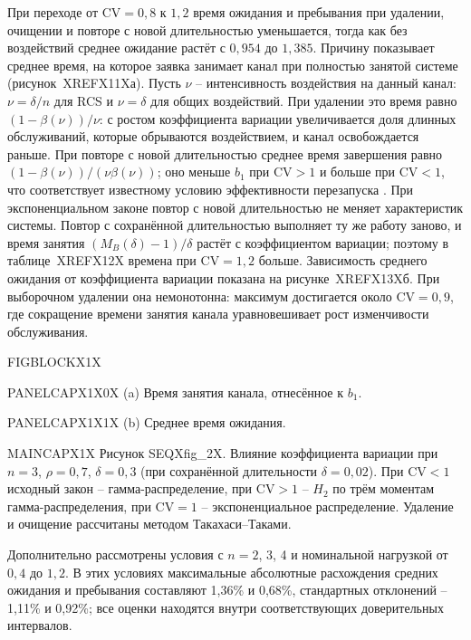 При переходе от \(\mathrm{CV}=0{,}8\) к \(1{,}2\) время ожидания и пребывания при удалении, очищении и повторе с новой длительностью уменьшается, тогда как без воздействий среднее ожидание растёт с \(0{,}954\) до \(1{,}385\). Причину показывает среднее время, на которое заявка занимает канал при полностью занятой системе (рисунок~XREFX11Xа). Пусть \(\nu\) -- интенсивность воздействия на данный канал: \(\nu=\delta/n\) для RCS и \(\nu=\delta\) для общих воздействий. При удалении это время равно \((1-\beta(\nu))/\nu\): с ростом коэффициента вариации увеличивается доля длинных обслуживаний, которые обрываются воздействием, и канал освобождается раньше. При повторе с новой длительностью среднее время завершения равно \((1-\beta(\nu))/(\nu\beta(\nu))\); оно меньше \(b_1\) при \(\mathrm{CV}>1\) и больше при \(\mathrm{CV}<1\), что соответствует известному условию эффективности перезапуска \cite{pal2017,bonomo2022}. При экспоненциальном законе повтор с новой длительностью не меняет характеристик системы. Повтор с сохранённой длительностью выполняет ту же работу заново, и время занятия \((M_B(\delta)-1)/\delta\) растёт с коэффициентом вариации; поэтому в таблице~XREFX12X времена при \(\mathrm{CV}=1{,}2\) больше. Зависимость среднего ожидания от коэффициента вариации показана на рисунке~XREFX13Xб. При выборочном удалении она немонотонна: максимум достигается около \(\mathrm{CV}=0{,}9\), где сокращение времени занятия канала уравновешивает рост изменчивости обслуживания.

\noindent FIGBLOCKX1X\par

\noindent PANELCAPX1X0X (a) Время занятия канала, отнесённое к \(b_1\).\par

\noindent PANELCAPX1X1X (b) Среднее время ожидания.\par

\noindent MAINCAPX1X Рисунок SEQXfig_2X. Влияние коэффициента вариации при \(n=3\), \(\rho=0{,}7\), \(\delta=0{,}3\) (при сохранённой длительности \(\delta=0{,}02\)). При \(\mathrm{CV}<1\) исходный закон -- гамма-распределение, при \(\mathrm{CV}>1\) -- \(H_2\) по трём моментам гамма-распределения, при \(\mathrm{CV}=1\) -- экспоненциальное распределение. Удаление и очищение рассчитаны методом Такахаси--Таками.\par

Дополнительно рассмотрены условия с \(n=2\), 3, 4 и номинальной нагрузкой от \(0{,}4\) до \(1{,}2\). В этих условиях максимальные абсолютные расхождения средних ожидания и пребывания составляют 1,36\% и 0,68\%, стандартных отклонений -- 1,11\% и 0,92\%; все оценки находятся внутри соответствующих доверительных интервалов.

